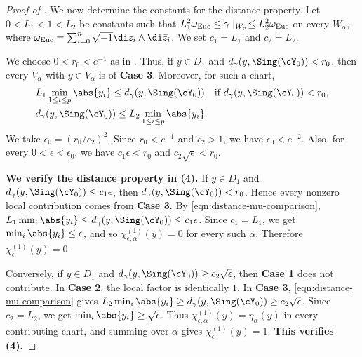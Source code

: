 \documentclass[12pt]{amsart}
\begin{document}
\begin{proof}[Proof of ]
    We now determine the constants for the distance property. Let
    $0<L_1<1<L_2$ be constants such that
    $L_1^2\omega_{\rm Euc}\leq\gamma\mid_{W_\alpha}\leq
    L_2^2\omega_{\rm Euc}$ on every $W_\alpha$, where
    $\omega_{\rm Euc}=\sum_{i=0}^n\sqrt{-1}\di z_i\wedge\di\bar z_i$.
    We set $c_1=L_1$ and $c_2=L_2$.

    We choose $0<r_0<e^{-1}$ as in
    . Thus, if
    $y\in D_1$ and $d_\gamma(y,\Sing(\cY_0))<r_0$, then every
    $V_\alpha$ with $y\in V_\alpha$ is of \textbf{Case 3}. Moreover,
    for such a chart,
    \begin{equation}
        \label{eqn:distance-mu-comparison}
        \begin{aligned}
        &L_1\min_{1\leq i\leq p}\abs{y_i}
        \leq d_\gamma(y,\Sing(\cY_0))
        \quad\text{if }d_\gamma(y,\Sing(\cY_0))<r_0,\\
        &d_\gamma(y,\Sing(\cY_0))
        \leq L_2\min_{1\leq i\leq p}\abs{y_i}.
        \end{aligned}
    \end{equation}
    We take $\epsilon_0=(r_0/c_2)^2$. Since $r_0<e^{-1}$ and $c_2>1$, we
    have $\epsilon_0<e^{-2}$. Also, for every $0<\epsilon<\epsilon_0$, we
    have $c_1\epsilon<r_0$ and $c_2\sqrt{\epsilon}<r_0$.

    \textbf{We verify the distance property in (4).}
    If $y\in D_1$ and $d_\gamma(y,\Sing(\cY_0))\leq c_1\epsilon$, then
    $d_\gamma(y,\Sing(\cY_0))<r_0$. Hence every nonzero local contribution
    comes from \textbf{Case 3}. By \cref{eqn:distance-mu-comparison},
    $L_1\min_i\abs{y_i}\leq d_\gamma(y,\Sing(\cY_0))\leq c_1\epsilon$.
    Since $c_1=L_1$, we get $\min_i\abs{y_i}\leq\epsilon$, and so
    $\chi^{(1)}_{\epsilon,\alpha}(y)=0$ for every such $\alpha$.
    Therefore $\chi^{(1)}_\epsilon(y)=0$.

    Conversely, if $y\in D_1$ and
    $d_\gamma(y,\Sing(\cY_0))\geq c_2\sqrt{\epsilon}$, then \textbf{Case 1}
    does not contribute. In \textbf{Case 2}, the local factor is identically
    $1$. In \textbf{Case 3}, \cref{eqn:distance-mu-comparison} gives
    $L_2\min_i\abs{y_i}\geq d_\gamma(y,\Sing(\cY_0))\geq
    c_2\sqrt{\epsilon}$. Since $c_2=L_2$, we get
    $\min_i\abs{y_i}\geq\sqrt{\epsilon}$. Thus
    $\chi^{(1)}_{\epsilon,\alpha}(y)=\eta_\alpha(y)$ in every contributing
    chart, and summing over $\alpha$ gives $\chi^{(1)}_\epsilon(y)=1$.
    \textbf{This verifies (4).}


\end{proof}
\end{document}
